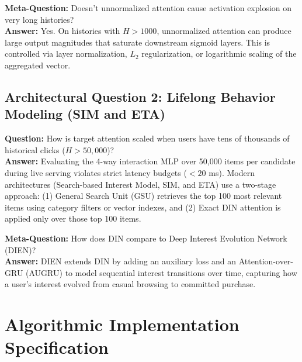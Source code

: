 \documentclass[11pt,a4paper]{article}
\theoremstyle{definition}
\begin{document}
\textbf{Meta-Question:} Doesn't unnormalized attention cause activation explosion on very long histories?\\
\textbf{Answer:} Yes. On histories with $H > 1000$, unnormalized attention can produce large output magnitudes that saturate downstream sigmoid layers. This is controlled via layer normalization, $L_2$ regularization, or logarithmic scaling of the aggregated vector.

\subsection{Architectural Question 2: Lifelong Behavior Modeling (SIM and ETA)}
\textbf{Question:} How is target attention scaled when users have tens of thousands of historical clicks ($H > 50,000$)?\\
\textbf{Answer:} Evaluating the 4-way interaction MLP over 50,000 items per candidate during live serving violates strict latency budgets ($<20$ ms). Modern architectures (Search-based Interest Model, SIM, and ETA) use a two-stage approach: (1) General Search Unit (GSU) retrieves the top 100 most relevant items using category filters or vector indexes, and (2) Exact DIN attention is applied only over those top 100 items.

\textbf{Meta-Question:} How does DIN compare to Deep Interest Evolution Network (DIEN)?\\
\textbf{Answer:} DIEN extends DIN by adding an auxiliary loss and an Attention-over-GRU (AUGRU) to model sequential interest transitions over time, capturing how a user's interest evolved from casual browsing to committed purchase.

\section{Algorithmic Implementation Specification}
\end{document}
